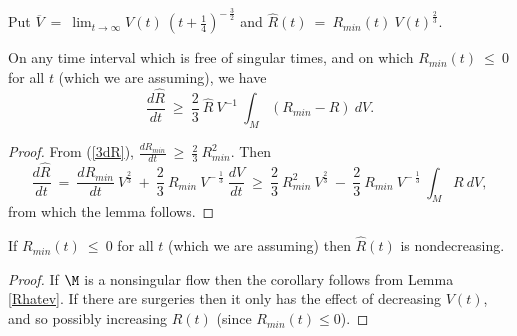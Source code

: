 \begin{definition}
  \label{def:kl-noncollapsed-pointed-limits-hyperbolic-noncollapsing-definition}
 \label{VR}
Put $\overline{V} \: = \: \lim_{t \rightarrow \infty} V(t) \: \left( t + \frac14 \right)^{- \: \frac32}$
and $\hat{R}(t) \: = \: R_{min}(t) \: V(t)^{\frac23}$.
\end{definition}

\begin{lemma}
  \label{lem:kl-noncollapsed-pointed-limits-hyperbolic-noncollapsing-lemma}
 \label{Rhatev}
On any time interval which is free of singular times,
and on which   $R_{min}(t) \: \le \: 0$ for all $t$
(which we are assuming), we have
\begin{equation} \label{Rhat}
\frac{d\hat{R}}{dt} \: \ge \: \frac23 \: \hat{R} \: V^{-1} \:
\int_M (R_{min} - R) \: dV.
\end{equation}
\end{lemma}
\begin{proof}
From (\ref{3dR}), $\frac{dR_{min}}{dt} \: \ge \: \frac23 \: R_{min}^2$.
Then
\begin{equation}
\frac{d\hat{R}}{dt} \: =\: \frac{dR_{min}}{dt} \: V^{\frac23} \: + \:
\frac23 \: R_{min} \: V^{- \: \frac13} \: \frac{dV}{dt} \: \ge \:
\frac23 \: R_{min}^2 \: V^{\frac23} \: - \:
\frac23 \: R_{min} \: V^{- \: \frac13} \: \int_M R \: dV,
\end{equation}
from which the lemma follows.
\end{proof}

\begin{corollary}
  \label{cor:kl-noncollapsed-pointed-limits-hyperbolic-monotonicity-noncollapsing}
 \label{Rmono}
If $R_{min}(t) \: \le \: 0$ for all $t$
(which we are assuming) then $\hat{R}(t)$ is nondecreasing.
\end{corollary}
\begin{proof}
If $\M$ is a nonsingular flow then the corollary follows from Lemma \ref{Rhatev}.
If there are surgeries then it only has the effect of decreasing $V(t)$, and so
possibly increasing $\hat{R}(t)$ (since $R_{min}(t) \le 0$).
\end{proof}

